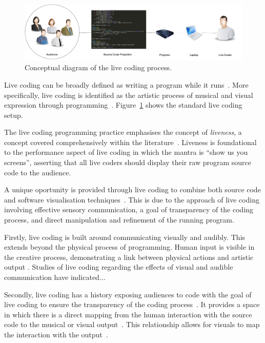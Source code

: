 \begin{figure}
\centering
\includegraphics[width=1.0\textwidth]{../images/live-coding-setup.pdf}
\caption[The live coding process]{Conceptual diagram of the live coding process.}
\label{fig:live-coding-setup}
\end{figure}

Live coding can be broadly defined as writing a program while it runs~\cite{Ward2004}. More specifically, live coding is identified as the artistic process of musical and visual expression through programming~\cite{Collins2003}. Figure~\ref{fig:live-coding-setup} shows the standard live coding setup.

The live coding programming practice emphasises the concept of \emph{liveness}, a concept covered comprehensively within the literature~\cite{Auslander,Masura2007}. Liveness is foundational to the performance aspect of live coding in which the mantra is ``show us you screens'', asserting that all live coders should display their raw program source code to the audience.

A unique oportunity is provided through live coding to combine both source code and software visualisation techniques~\cite{McLean2010a}. This is due to the approach of live coding involving effective sensory communication, a goal of transparency of the coding process, and direct manipulation and refinement of the running program.

Firstly, live coding is built around communicating visually and audibly. This extends beyond the physical process of programming. Human input is visible in the creative process, demonstrating a link between physical actions and artistic output \cite{Mclean}. Studies of live coding regarding the effects of visual and audible communication have indicated...

Secondly, live coding has a history exposing audiences to code with the goal of live coding to ensure the transparency of the coding process~\cite{Collins2011,McLean2010a}. It provides a space in which there is a direct mapping from the human interaction with the source code to the musical or visual output~\cite{Mclean}. This relationship allows for visuals to map the interaction with the output~.

